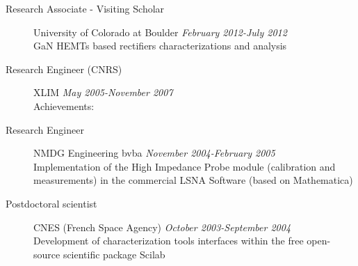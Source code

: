 \documentclass[margin,line]{resume}
\begin{document}
\begin{resume}
\begin{description}
    \item[Research Associate - Visiting Scholar]\small{University of
      Colorado at Boulder \hfill \textsl{February 2012-July 2012}}\\
      GaN HEMTs based rectifiers characterizations and analysis
      \vspace{2mm}

    \item[Research Engineer (CNRS)]\small{XLIM \hfill \textsl{May
      2005-November 2007}}\\
      Achievements:
        \vspace{2mm}


      \item[Research Engineer]\small{NMDG Engineering bvba \hfill
        \textsl{November 2004-February 2005}}\\
        Implementation of the High Impedance Probe module
        (calibration and measurements) in the commercial LSNA
        Software (based on Mathematica)

        \vspace{2mm}


      \item[Postdoctoral scientist]\small{CNES (French Space Agency)
        \hfill \textsl{October 2003-September 2004}}\\
        Development of characterization tools interfaces within the
        free open-source scientific package Scilab

        \vspace{2mm}



\end{description}
\end{resume}
\end{document}
